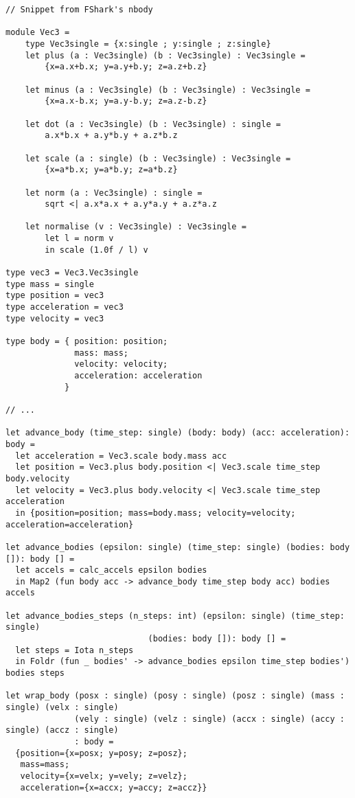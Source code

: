 \begin{verbatim}
// Snippet from FShark's nbody

module Vec3 =
    type Vec3single = {x:single ; y:single ; z:single}
    let plus (a : Vec3single) (b : Vec3single) : Vec3single =
        {x=a.x+b.x; y=a.y+b.y; z=a.z+b.z}
            
    let minus (a : Vec3single) (b : Vec3single) : Vec3single =
        {x=a.x-b.x; y=a.y-b.y; z=a.z-b.z}
        
    let dot (a : Vec3single) (b : Vec3single) : single =
        a.x*b.x + a.y*b.y + a.z*b.z
        
    let scale (a : single) (b : Vec3single) : Vec3single =
        {x=a*b.x; y=a*b.y; z=a*b.z}
        
    let norm (a : Vec3single) : single =
        sqrt <| a.x*a.x + a.y*a.y + a.z*a.z
        
    let normalise (v : Vec3single) : Vec3single =
        let l = norm v
        in scale (1.0f / l) v
        
type vec3 = Vec3.Vec3single
type mass = single
type position = vec3
type acceleration = vec3
type velocity = vec3

type body = { position: position;
              mass: mass;
              velocity: velocity;
              acceleration: acceleration
            }

// ...

let advance_body (time_step: single) (body: body) (acc: acceleration): body =
  let acceleration = Vec3.scale body.mass acc
  let position = Vec3.plus body.position <| Vec3.scale time_step body.velocity
  let velocity = Vec3.plus body.velocity <| Vec3.scale time_step acceleration
  in {position=position; mass=body.mass; velocity=velocity; acceleration=acceleration}

let advance_bodies (epsilon: single) (time_step: single) (bodies: body []): body [] =
  let accels = calc_accels epsilon bodies
  in Map2 (fun body acc -> advance_body time_step body acc) bodies accels

let advance_bodies_steps (n_steps: int) (epsilon: single) (time_step: single)
                             (bodies: body []): body [] =
  let steps = Iota n_steps
  in Foldr (fun _ bodies' -> advance_bodies epsilon time_step bodies') bodies steps

let wrap_body (posx : single) (posy : single) (posz : single) (mass : single) (velx : single)
              (vely : single) (velz : single) (accx : single) (accy : single) (accz : single)
              : body =
  {position={x=posx; y=posy; z=posz};
   mass=mass;
   velocity={x=velx; y=vely; z=velz};
   acceleration={x=accx; y=accy; z=accz}}


\end{verbatim}
